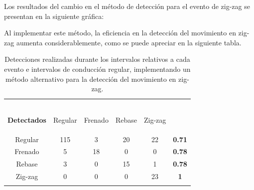 Los resultados del cambio en el método de detección para el evento de zig-zag se presentan en la siguiente gráfica:

\vspace{12.2cm}

Al implementar este método, la eficiencia en la detección del movimiento en zig-zag aumenta considerablemente, como se puede apreciar en la siguiente tabla.

\begin{table}[H]
\centering
\begin{tabular}{||c|c|c|c|c||c||}
\hhline{|t:=====:t:=:t|}
\backslashbox{\bf Etiqueta\\ \\ }{\\ \bf Detectados} & \begin{sideways}\hspace{-0.7cm}Regular\end{sideways} & \begin{sideways}\hspace{-0.7cm}Frenado\end{sideways} & \begin{sideways}\hspace{-0.7cm}Rebase\end{sideways} & \begin{sideways}\hspace{-0.7cm}Zig-zag\end{sideways} & \begin{sideways}\hspace{-0.7cm}{\bf Eficiencia}\end{sideways} \\ 
\hhline{||-----||-||}
Regular & 115 & 3 & 20 & 22 & \bf 0.71 \\ 
\hhline{||-----||-||}
Frenado & 5 & 18 & 0 & 0 & \bf 0.78 \\ 
\hhline{||-----||-||}
Rebase & 3 & 0 & 15 & 1 & \bf 0.78 \\ 
\hhline{||-----||-||}
Zig-zag & 0 & 0 & 0 & 23 & \bf 1 \\ 
\hhline{|b:=====:b:=:b|}
\end{tabular}
\caption{Detecciones realizadas durante los intervalos relativos a cada evento e intervalos de conducción regular, implementando un método alternativo para la detección del movimiento en zig-zag.}
\end{table}

